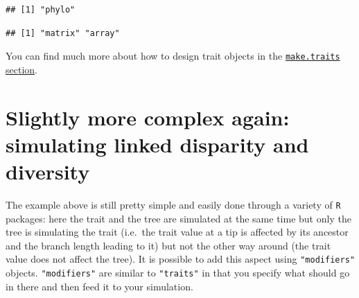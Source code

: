 \documentclass[
]{book}
\newenvironment{Shaded}{\begin{snugshade}}{\end{snugshade}}
\newcommand{\CommentTok}[1]{\textcolor[rgb]{0.56,0.35,0.01}{\textit{#1}}}
\newcommand{\KeywordTok}[1]{\textcolor[rgb]{0.13,0.29,0.53}{\textbf{#1}}}
\newcommand{\NormalTok}[1]{#1}
\newcommand{\OperatorTok}[1]{\textcolor[rgb]{0.81,0.36,0.00}{\textbf{#1}}}
\newcommand{\StringTok}[1]{\textcolor[rgb]{0.31,0.60,0.02}{#1}}
\begin{document}
\begin{Shaded}
\end{Shaded}

\begin{verbatim}
## [1] "phylo"
\end{verbatim}

\begin{Shaded}
\end{Shaded}

\begin{verbatim}
## [1] "matrix" "array"
\end{verbatim}

You can find much more about how to design trait objects in the \protect\hyperlink{maketraits}{\texttt{make.traits} section}.

\hypertarget{slightly-more-complex-again-simulating-linked-disparity-and-diversity}{%
\section{Slightly more complex again: simulating linked disparity and diversity}\label{slightly-more-complex-again-simulating-linked-disparity-and-diversity}}

The example above is still pretty simple and easily done through a variety of \texttt{R} packages: here the trait and the tree are simulated at the same time but only the tree is simulating the trait (i.e.~the trait value at a tip is affected by its ancestor and the branch length leading to it) but not the other way around (the trait value does not affect the tree).
It is possible to add this aspect using \texttt{"modifiers"} objects.
\texttt{"modifiers"} are similar to \texttt{"traits"} in that you specify what should go in there and then feed it to your simulation.
\end{document}
